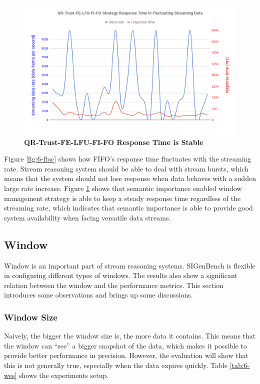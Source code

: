 \begin{figure}[!htbp]
	\centering
    \includegraphics[width=5in]{img/6-flat.png}
    \caption{\textbf{QR-Trust-FE-LFU-FI-FO Response Time is Stable}}
   	\label{fig:6-flat}
\end{figure}

Figure \ref{fig:6-fluc} shows how FIFO's response time fluctuates with the streaming rate.
Stream reasoning system should be able to deal with stream bursts, which means that the system should not lose response when data behaves with a sudden large rate increase. 
Figure \ref{fig:6-flat} shows that semantic importance enabled window management strategy is able to keep a steady response time regardless of the streaming rate, which indicates that semantic importance is able to provide good system availability when facing versatile data streams. 
%
\subsection{Window}
Window is an important part of stream reasoning systems. 
SIGenBench is flexible in configuring different types of windows.
The results also show a significant relation between the window and the performance metrics.
This section introduces some observations and brings up some discussions. 
%
\subsubsection{Window Size}
Naively, the bigger the window size is, the more data it contains.
This means that the window can ``see'' a bigger snapshot of the data, which makes it possible to provide better performance in precision. 
However, the evaluation will show that this is not generally true, especially when the data expires quickly. 
Table \ref{tab:6-wes} shows the experiments setup.


